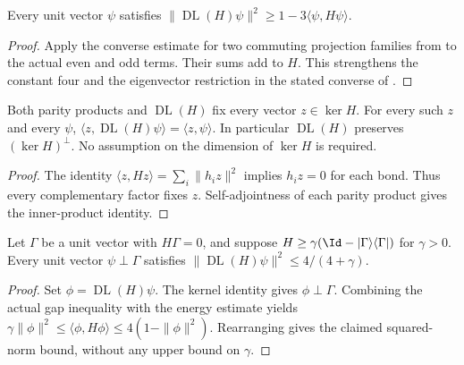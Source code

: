 \begin{lemma}
    \label{thm:physical_detectability_converse}
    \leanok
    Every unit vector $\psi$ satisfies
    $\|\operatorname{DL}(H)\psi\|^2\ge1-3\langle\psi,H\psi\rangle$.
\end{lemma}
\begin{proof}\leanok
    Apply the converse estimate for two commuting projection families
    from \cite{QICLean2026Blueprint} to the actual even and odd terms.
    Their sums add to $H$. This strengthens the constant four and the
    eigenvector restriction in the stated converse of
    \cite{Arad2016RigorousRG}.
\end{proof}

\begin{lemma}
    \label{thm:physical_detectability_kernel}
    \leanok
    Both parity products and $\operatorname{DL}(H)$ fix every vector
    $z\in\ker H$. For every such $z$ and every $\psi$,
    $\langle z,\operatorname{DL}(H)\psi\rangle=\langle z,\psi\rangle$.
    In particular $\operatorname{DL}(H)$ preserves $(\ker H)^\perp$.
    No assumption on the dimension of $\ker H$ is required.
\end{lemma}
\begin{proof}\leanok
    The identity $\langle z,Hz\rangle=\sum_i\|h_i z\|^2$ implies
    $h_i z=0$ for each bond. Thus every complementary factor fixes $z$.
    Self-adjointness of each parity product gives the inner-product identity.
\end{proof}

\begin{lemma}
    \label{thm:physical_detectability_gap}
    \leanok
    Let $\Gamma$ be a unit vector with $H\Gamma=0$, and suppose
    $H\ge\gamma(\Id-|\Gamma\rangle\langle\Gamma|)$ for $\gamma>0$.
    Every unit vector $\psi\perp\Gamma$ satisfies
    $\|\operatorname{DL}(H)\psi\|^2\le4/(4+\gamma)$.
\end{lemma}
\begin{proof}\leanok
    Set $\phi=\operatorname{DL}(H)\psi$. The kernel identity gives
    $\phi\perp\Gamma$. Combining the actual gap inequality with the
    energy estimate yields
    $\gamma\|\phi\|^2\le\langle\phi,H\phi\rangle
        \le4(1-\|\phi\|^2)$.
    Rearranging gives the claimed squared-norm bound, without any upper
    bound on $\gamma$.
\end{proof}

